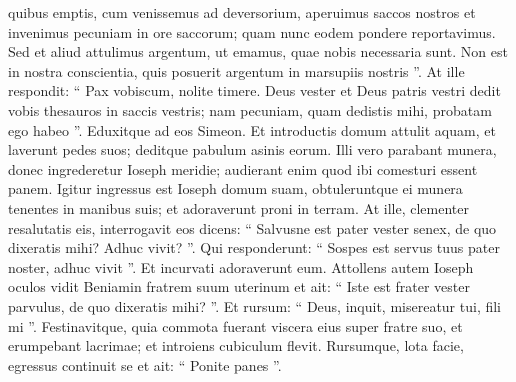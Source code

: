 \begin{biblechapter}
\begin{biblechapter}
\begin{biblechapter}
\begin{biblechapter}
\begin{biblechapter}
\begin{biblechapter}
\begin{biblechapter}
\begin{biblechapter}
\begin{biblechapter}
\begin{biblechapter}
\begin{biblechapter}
\begin{biblechapter}
\begin{biblechapter}
\begin{biblechapter}
\begin{biblechapter}
\begin{biblechapter}
\begin{biblechapter}
\begin{biblechapter}
\begin{biblechapter}
\begin{biblechapter}
\begin{biblechapter}
\begin{biblechapter}
\begin{biblechapter}
\begin{biblechapter}
\begin{biblechapter}
\begin{biblechapter}
\begin{biblechapter}
\begin{biblechapter}
\begin{biblechapter}
\begin{biblechapter}
\begin{biblechapter}
\begin{biblechapter}
\begin{biblechapter}
\begin{biblechapter}
\begin{biblechapter}
\begin{biblechapter}
\begin{biblechapter}
\begin{biblechapter}
\begin{biblechapter}
\begin{biblechapter}
\begin{biblechapter}
\begin{biblechapter}
\begin{biblechapter}
\verse quibus emptis, cum venissemus ad deversorium, aperuimus saccos nostros et invenimus pecuniam in ore saccorum; quam nunc eodem pondere reportavimus. 
\verse Sed et aliud attulimus argentum, ut emamus, quae nobis necessaria sunt. Non est in nostra conscientia, quis posuerit argentum in marsupiis nostris ”.
 \verse At ille respondit: “ Pax vobiscum, nolite timere. Deus vester et Deus patris vestri dedit vobis thesauros in saccis vestris; nam pecuniam, quam dedistis mihi, probatam ego habeo ”. Eduxitque ad eos Simeon. 
\verse Et introductis domum attulit aquam, et laverunt pedes suos; deditque pabulum asinis eorum. 
\verse Illi vero parabant munera, donec ingrederetur Ioseph meridie; audierant enim quod ibi comesturi essent panem.
 \verse Igitur ingressus est Ioseph domum suam, obtuleruntque ei munera tenentes in manibus suis; et adoraverunt proni in terram. 
\verse At ille, clementer resalutatis eis, interrogavit eos dicens: “ Salvusne est pater vester senex, de quo dixeratis mihi? Adhuc vivit? ”. 
\verse Qui responderunt: “ Sospes est servus tuus pater noster, adhuc vivit ”. Et incurvati adoraverunt eum.
 \verse Attollens autem Ioseph oculos vidit Beniamin fratrem suum uterinum et ait: “ Iste est frater vester parvulus, de quo dixeratis mihi? ”. Et rursum: “ Deus, inquit, misereatur tui, fili mi ”. 
\verse Festinavitque, quia commota fuerant viscera eius super fratre suo, et erumpebant lacrimae; et introiens cubiculum flevit.
 \verse Rursumque, lota facie, egressus continuit se et ait: “ Ponite panes ”. 

\end{biblechapter}
\end{biblechapter}
\end{biblechapter}
\end{biblechapter}
\end{biblechapter}
\end{biblechapter}
\end{biblechapter}
\end{biblechapter}
\end{biblechapter}
\end{biblechapter}
\end{biblechapter}
\end{biblechapter}
\end{biblechapter}
\end{biblechapter}
\end{biblechapter}
\end{biblechapter}
\end{biblechapter}
\end{biblechapter}
\end{biblechapter}
\end{biblechapter}
\end{biblechapter}
\end{biblechapter}
\end{biblechapter}
\end{biblechapter}
\end{biblechapter}
\end{biblechapter}
\end{biblechapter}
\end{biblechapter}
\end{biblechapter}
\end{biblechapter}
\end{biblechapter}
\end{biblechapter}
\end{biblechapter}
\end{biblechapter}
\end{biblechapter}
\end{biblechapter}
\end{biblechapter}
\end{biblechapter}
\end{biblechapter}
\end{biblechapter}
\end{biblechapter}
\end{biblechapter}
\end{biblechapter}

